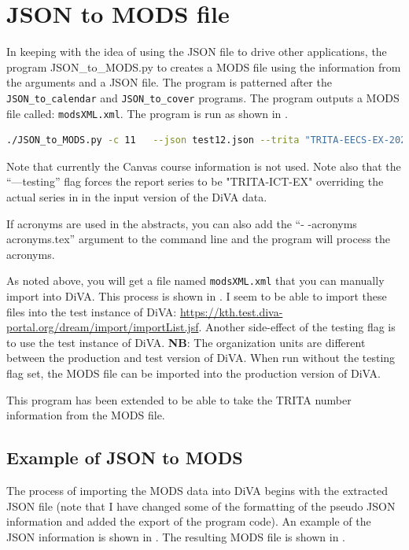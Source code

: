 \section{JSON to MODS file}
\label{sec:JSONtoMODSfile}
In keeping with the idea of using the JSON file to drive other applications, the program JSON\_to\_MODS.py to creates a MODS file using the information from the arguments and a JSON file.
The program is patterned after the \texttt{JSON\_to\_calendar} and \texttt{JSON\_to\_cover} programs. The program outputs a MODS file called: \texttt{modsXML.xml}. The program is run as shown in .
\begin{lstlisting}[language={bash}, caption={Example of using JSON\_to\_MODS.py}, label=lst:jsonToMods]
./JSON_to_MODS.py -c 11   --json test12.json --trita "TRITA-EECS-EX-2021:219" --testing
\end{lstlisting}


Note that currently the Canvas course information is not used. Note also that the “—testing” flag forces the report series to be  "TRITA-ICT-EX" overriding the actual series in in the input version of the DiVA data.

If acronyms are used in the abstracts, you can also add the “- -acronyms acronyms.tex” argument to the command line and the program will process the acronyms.

As noted above, you will get a file named \texttt{modsXML.xml} that you can manually import into DiVA. This process is shown in . I seem to be able to import these files into the test instance of DiVA:	\url{https://kth.test.diva-portal.org/dream/import/importList.jsf}. Another side-effect of the testing flag is to use the test instance of DiVA. \textbf{NB}: The organization units are different between the production and test version of DiVA. When run without the testing flag set, the MODS file can be imported into the production version of DiVA.

This program has been extended to be able to take the TRITA number information from the MODS file.


\subsection{Example of JSON to MODS}
The process of importing the MODS data into DiVA begins with the extracted JSON file (note that I have changed some of the formatting of the pseudo JSON information and added the export of the program code). An example of the JSON information is shown in . The resulting MODS file is shown in .

